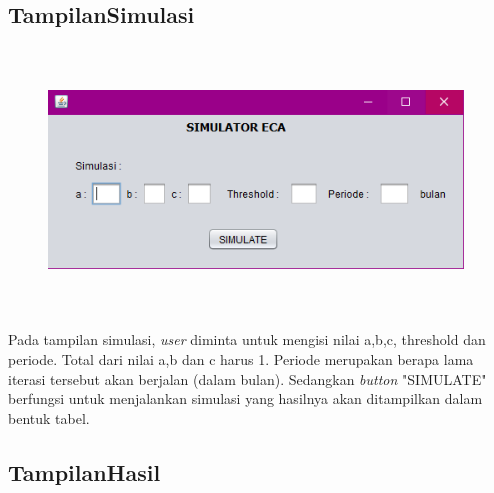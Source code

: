 \subsection{TampilanSimulasi}

\begin{figure} [H]
	\centering  
	\includegraphics[width=11cm, height=7cm]{tampilanSimulasii} 
	\label{fig:simulasi} 
\end{figure}

Pada tampilan simulasi, \textit{user} diminta untuk mengisi nilai a,b,c, threshold dan periode. Total dari nilai a,b dan c harus 1. Periode merupakan berapa lama iterasi tersebut akan berjalan (dalam bulan). Sedangkan \textit{button} "SIMULATE" berfungsi untuk menjalankan simulasi yang hasilnya akan ditampilkan dalam bentuk tabel.

\subsection{TampilanHasil}

